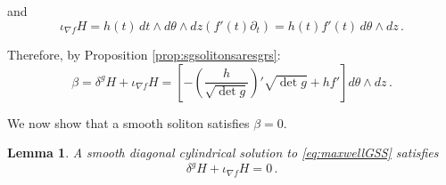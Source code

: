 \documentclass[12pt,a4paper,reqno]{amsart}
\theoremstyle{plain}
\newtheorem{lemma}[theorem]{Lemma}
\theoremstyle{remark}
\numberwithin{equation}{section}
\begin{document}
and
\begin{equation*}
\iota_{\nabla f} H = h(t) \,dt\wedge d\theta\wedge dz(f'(t)\partial_t) = h(t) f'(t) \,d\theta\wedge dz \,.
\end{equation*}

Therefore, by Proposition \ref{prop:sgsolitonsaresgrs}:
\begin{equation}\label{eq:maxred}
\beta = \delta^g H + \iota_{\nabla f} H = 
\left[-\left(\frac{h}{\sqrt{\det g}}\right)' \sqrt{\det g} + h f' \right] d\theta\wedge dz \,.
\end{equation}

We now show that a smooth soliton satisfies $\beta=0$.

\begin{lemma}\label{lemma:maxwell}
A smooth diagonal cylindrical solution to \eqref{eq:maxwellGSS} satisfies
\begin{equation*}
\delta^gH + \iota_{\nabla f} H = 0 \,.
\end{equation*}
\end{lemma}
\end{document}
